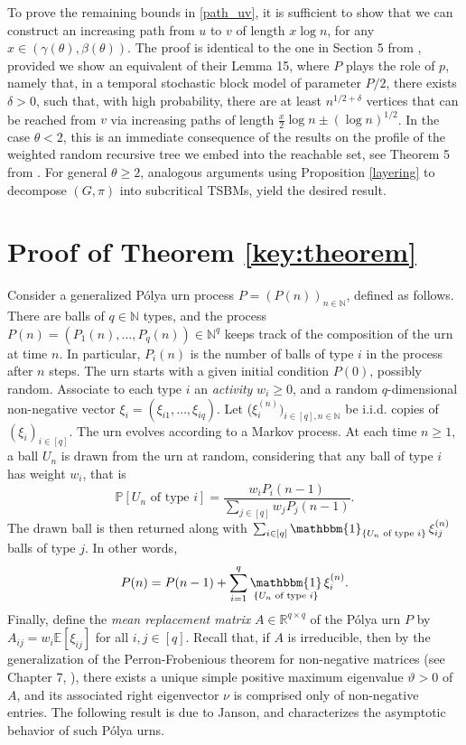 \documentclass[11pt]{article}
\numberwithin{equation}{section}
\DeclareMathOperator{\indicatrice}{\mathbbm{1}}
\theoremstyle{definition}
\newcommand\bE{{\mathbb E}}
\newcommand\bN{{\mathbb N}}
\newcommand\bP{{\mathbb P}}
\newcommand\bR{{\mathbb R}}
\begin{document}
To prove the remaining bounds in \ref{path_uv}, it is sufficient to show that we can construct an increasing path from $u$ to $v$ of length $x \log n$, for any $x \in (\gamma(\theta),\beta(\theta))$. The proof is identical to the one in Section 5 from \cite{BKL24}, provided we show an equivalent of their Lemma 15, where $P$ plays the role of $p$, namely that, in a temporal stochastic block model of parameter $P/2$, there exists $\delta > 0$, such that, with high probability, there are at least $n^{1/2 + \delta}$ vertices that can be reached from $v$ via increasing paths of length $\frac{x}{2}\log n \pm (\log n)^{1/2}$. In the case $\theta < 2$, this is an immediate consequence of the results on the profile of the weighted random recursive tree we embed into the reachable set, see Theorem 5 from \cite{S18}. For general $\theta \geq 2$, analogous arguments using Proposition \ref{layering} to decompose $(G,\pi)$ into subcritical TSBMs, yield the desired result.

\section{Proof of Theorem \ref{key:theorem}}
\label{section:proof_key_thm}

Consider a generalized P\'olya urn process $P=(P(n))_{n \in \bN}$, defined as follows. There are balls of $q\in\bN$ types, and the process $P(n)=(P_1(n),\ldots,P_q(n)) \in \bN^q$ keeps track of the composition of the urn at time $n$. In particular, $P_i(n)$ is the number of balls of type $i$ in the process after $n$ steps. The urn starts with a given initial condition $P(0)$, possibly random. Associate to each type $i$ an \emph{activity} $w_i \geq 0$, and a random $q$-dimensional non-negative vector $\xi_i = (\xi_{i1},\ldots,\xi_{iq})$. Let ($\xi^{(n)}_i)_{i\in [q],n\in \bN}$ be i.i.d. copies of $(\xi_i)_{i\in [q]}$. The urn evolves according to a Markov process. At each time $n\geq 1$, a ball $U_n$ is drawn from the urn at random, considering that any ball of type $i$ has weight $w_i$, that is
$$\bP[U_n \textrm{ of type } i] = \frac{w_i P_i(n-1)}{\sum_{j \in [q]}w_j P_j(n-1) } .$$
The drawn ball is then returned along with $\sum_{i\in [q]}\indicatrice_{\{U_n \textrm{ of type }i\}}\xi^{(n)}_{ij}$ balls of type $j$. In other words,
$$P(n) = P(n-1) + \sum_{i=1}^q \indicatrice_{\{U_n \textrm{ of type }i\}}\xi^{(n)}_{i} .$$
Finally, define the \emph{mean replacement matrix} $A \in \bR^{q \times q}$ of the P\' olya urn $P$ by
$A_{ij} = w_i \bE[\xi_{ij}]$ for all $i,j \in [q]$. Recall that, if $A$ is irreducible, then by the generalization of the Perron-Frobenious theorem for non-negative matrices (see Chapter 7, \cite{M23}), there exists a unique simple positive maximum eigenvalue $\vartheta>0$ of $A$, and its associated right eigenvector $\nu$ is comprised only of non-negative entries. The following result is due to Janson, and characterizes the asymptotic behavior of such P\' olya urns.
\end{document}
